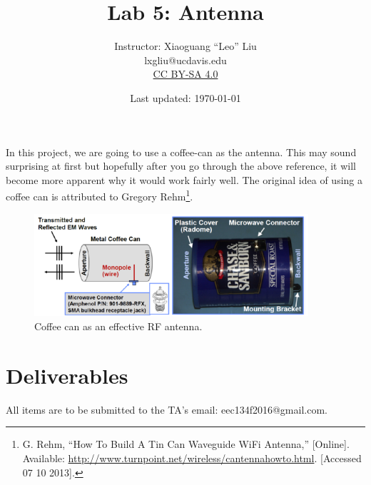 \documentclass[letterpaper, 11pt]{article}
\begin{document}
\title{Lab 5: Antenna}
\author{Instructor: Xiaoguang ``Leo'' Liu\\lxgliu@ucdavis.edu \\
	\small \href{http://creativecommons.org/licenses/by-sa/4.0/}{CC BY-SA 4.0}}
\date{Last updated: \today}

\maketitle

In this project, we are going to use a coffee-can as the antenna. This may sound surprising at first but hopefully after you go through the above reference, it will become more apparent why it would work fairly well. The original idea of using a coffee can is attributed to Gregory Rehm\footnote{G. Rehm, ``How To Build A Tin Can Waveguide WiFi Antenna,'' [Online]. Available: \url{http://www.turnpoint.net/wireless/cantennahowto.html}. [Accessed 07 10 2013].}. 

	\begin{figure}[ht]
		\centering	
		\includegraphics[width=4in]{coffee-can}
		\caption{Coffee can as an effective RF antenna.}
		\label{fig:coffee-can}
	\end{figure}
		
		
%


\section{Deliverables}
All items are to be submitted to the TA's email: eec134f2016@gmail.com.  
\end{document}
